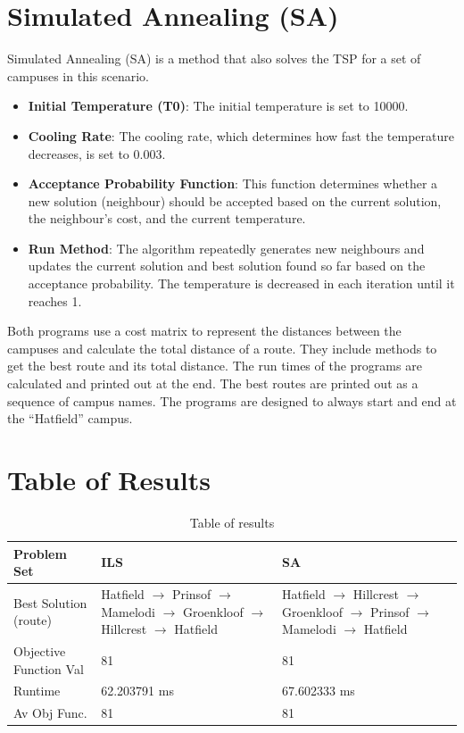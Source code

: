 \documentclass{article}
\begin{document}
\section{Simulated Annealing (SA)}
Simulated Annealing (SA) is a method that also solves the TSP for a set of campuses in this scenario.
\begin{itemize}
    \item \textbf{Initial Temperature (T0)}: The initial temperature is set to 10000.
    \item \textbf{Cooling Rate}: The cooling rate, which determines how fast the temperature decreases, is set to 0.003.
    \item \textbf{Acceptance Probability Function}: This function determines whether a new solution (neighbour) should be accepted based on the current solution, the neighbour’s cost, and the current temperature.
    \item \textbf{Run Method}: The algorithm repeatedly generates new neighbours and updates the current solution and best solution found so far based on the acceptance probability. The temperature is decreased in each iteration until it reaches 1.
\end{itemize}
Both programs use a cost matrix to represent the distances between the campuses and calculate the total distance of a route. They include methods to get the best route and its total distance. The run times of the programs are calculated and printed out at the end. The best routes are printed out as a sequence of campus names. The programs are designed to always start and end at the “Hatfield” campus.

\section{Table of Results}
\begin{table}[h]
\centering
\begin{tabular}{|l|p{5cm}|p{5cm}|}
\hline
\textbf{Problem Set} & \textbf{ILS} & \textbf{SA} \\ \hline
Best Solution (route) & Hatfield $\rightarrow$ Prinsof $\rightarrow$ Mamelodi $\rightarrow$ Groenkloof $\rightarrow$ Hillcrest $\rightarrow$ Hatfield & Hatfield $\rightarrow$ Hillcrest $\rightarrow$ Groenkloof $\rightarrow$ Prinsof $\rightarrow$ Mamelodi $\rightarrow$ Hatfield \\ \hline
Objective Function Val & 81 & 81 \\ \hline
Runtime & 62.203791 ms & 67.602333 ms \\ \hline
Av Obj Func. & 81 & 81 \\ \hline
\end{tabular}
\caption{Table of results}
\end{table}
\end{document}
